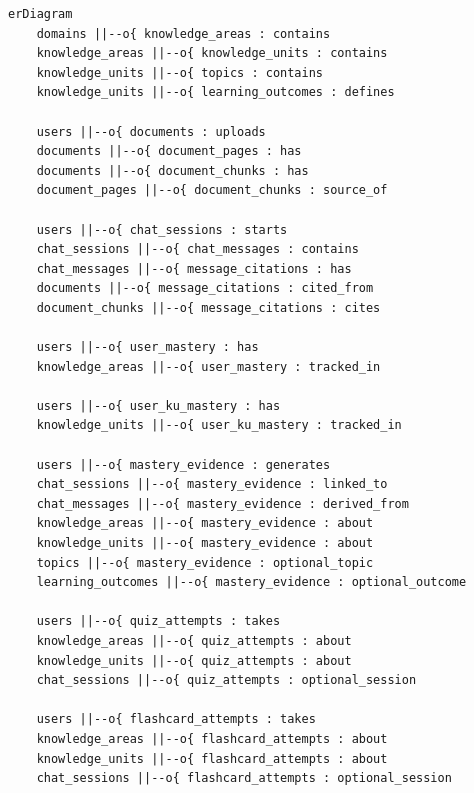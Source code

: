 \documentclass[12pt,A4]{report}
\begin{document}
\begin{lstlisting}[language={},breaklines=true]
erDiagram
    domains ||--o{ knowledge_areas : contains
    knowledge_areas ||--o{ knowledge_units : contains
    knowledge_units ||--o{ topics : contains
    knowledge_units ||--o{ learning_outcomes : defines

    users ||--o{ documents : uploads
    documents ||--o{ document_pages : has
    documents ||--o{ document_chunks : has
    document_pages ||--o{ document_chunks : source_of

    users ||--o{ chat_sessions : starts
    chat_sessions ||--o{ chat_messages : contains
    chat_messages ||--o{ message_citations : has
    documents ||--o{ message_citations : cited_from
    document_chunks ||--o{ message_citations : cites

    users ||--o{ user_mastery : has
    knowledge_areas ||--o{ user_mastery : tracked_in

    users ||--o{ user_ku_mastery : has
    knowledge_units ||--o{ user_ku_mastery : tracked_in

    users ||--o{ mastery_evidence : generates
    chat_sessions ||--o{ mastery_evidence : linked_to
    chat_messages ||--o{ mastery_evidence : derived_from
    knowledge_areas ||--o{ mastery_evidence : about
    knowledge_units ||--o{ mastery_evidence : about
    topics ||--o{ mastery_evidence : optional_topic
    learning_outcomes ||--o{ mastery_evidence : optional_outcome

    users ||--o{ quiz_attempts : takes
    knowledge_areas ||--o{ quiz_attempts : about
    knowledge_units ||--o{ quiz_attempts : about
    chat_sessions ||--o{ quiz_attempts : optional_session

    users ||--o{ flashcard_attempts : takes
    knowledge_areas ||--o{ flashcard_attempts : about
    knowledge_units ||--o{ flashcard_attempts : about
    chat_sessions ||--o{ flashcard_attempts : optional_session
\end{lstlisting}
\end{document}

